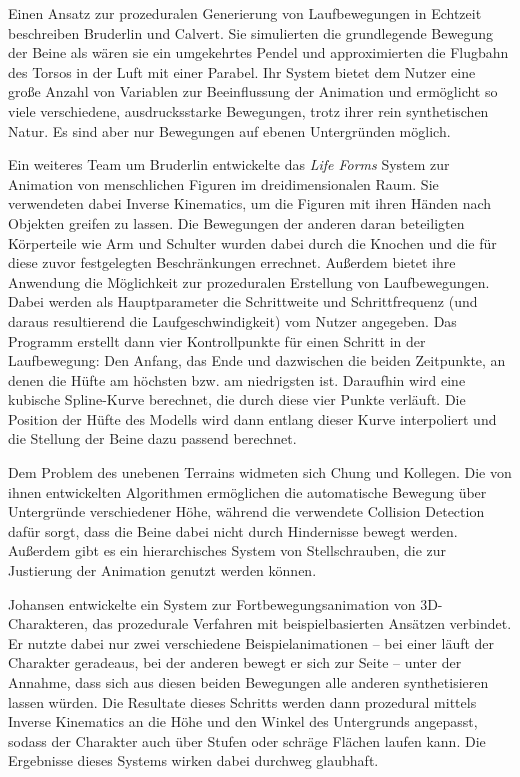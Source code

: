 Einen Ansatz zur prozeduralen Generierung von Laufbewegungen in Echtzeit beschreiben Bruderlin und Calvert\cite{bruderlin1993interactive}\cite{bruderlin1996knowledge}. Sie simulierten die grundlegende Bewegung der Beine als wären sie ein umgekehrtes Pendel und approximierten die Flugbahn des Torsos in der Luft mit einer Parabel. Ihr System bietet dem Nutzer eine große Anzahl von Variablen zur Beeinflussung der Animation und ermöglicht so viele verschiedene, ausdrucksstarke Bewegungen, trotz ihrer rein synthetischen Natur. Es sind aber nur Bewegungen auf ebenen Untergründen möglich.

Ein weiteres Team um Bruderlin\cite{bruderlin1994procedural} entwickelte das \textit{Life Forms} System zur Animation von menschlichen Figuren im dreidimensionalen Raum. Sie verwendeten dabei Inverse Kinematics, um die Figuren mit ihren Händen nach Objekten greifen zu lassen. Die Bewegungen der anderen daran beteiligten Körperteile wie Arm und Schulter wurden dabei durch die Knochen und die für diese zuvor festgelegten Beschränkungen errechnet. Außerdem bietet ihre Anwendung die Möglichkeit zur prozeduralen Erstellung von Laufbewegungen. Dabei werden als Hauptparameter die Schrittweite und Schrittfrequenz (und daraus resultierend die Laufgeschwindigkeit) vom Nutzer angegeben. Das Programm erstellt dann vier Kontrollpunkte für einen Schritt in der Laufbewegung: Den Anfang, das Ende und dazwischen die beiden Zeitpunkte, an denen die Hüfte am höchsten bzw. am niedrigsten ist. Daraufhin wird eine kubische Spline-Kurve berechnet, die durch diese vier Punkte verläuft. Die Position der Hüfte des Modells wird dann entlang dieser Kurve interpoliert und die Stellung der Beine dazu passend berechnet.

Dem Problem des unebenen Terrains widmeten sich Chung und Kollegen\cite{chung1999animation}. Die von ihnen entwickelten Algorithmen ermöglichen die automatische Bewegung über Untergründe verschiedener Höhe, während die verwendete Collision Detection dafür sorgt, dass die Beine dabei nicht durch Hindernisse bewegt werden. Außerdem gibt es ein hierarchisches System von Stellschrauben, die zur Justierung der Animation genutzt werden können.

Johansen\cite{johansen2009automated} entwickelte ein System zur Fortbewegungsanimation von 3D-Charakteren, das prozedurale Verfahren mit beispielbasierten Ansätzen verbindet. Er nutzte dabei nur zwei verschiedene Beispielanimationen -- bei einer läuft der Charakter geradeaus, bei der anderen bewegt er sich zur Seite -- unter der Annahme, dass sich aus diesen beiden Bewegungen alle anderen synthetisieren lassen würden. Die Resultate dieses Schritts werden dann prozedural mittels Inverse Kinematics an die Höhe und den Winkel des Untergrunds angepasst, sodass der Charakter auch über Stufen oder schräge Flächen laufen kann. Die Ergebnisse dieses Systems wirken dabei durchweg glaubhaft.


